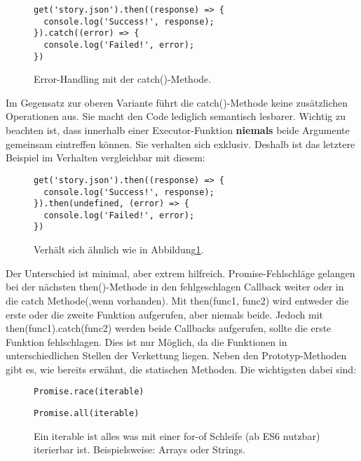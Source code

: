 \begin{figure}[H]
\begin{lstlisting}[basicstyle=\small]
get('story.json').then((response) => {
  console.log('Success!', response);
}).catch((error) => {
  console.log('Failed!', error);
})
\end{lstlisting}
\caption{Error-Handling mit der catch()-Methode\cite{callback-vs-promises}.}
\label{error-with-catch}
\end{figure}

\noindent
Im Gegensatz zur oberen Variante führt die catch()-Methode keine zusätzlichen Operationen aus. Sie macht den Code lediglich semantisch lesbarer. Wichtig zu beachten ist, dass innerhalb einer Executor-Funktion \textbf{niemals} beide Argumente gemeinsam eintreffen können. Sie verhalten sich exklusiv. Deshalb ist das letztere Beispiel im Verhalten vergleichbar mit diesem:

\begin{figure}[H]
\begin{lstlisting}[basicstyle=\small]
get('story.json').then((response) => {
  console.log('Success!', response);
}).then(undefined, (error) => {
  console.log('Failed!', error);
})
\end{lstlisting}
\caption{Verhält sich ähnlich wie in Abbildung\ref{error-with-catch}.}
\end{figure}

\noindent
Der Unterschied ist minimal, aber extrem hilfreich. Promise-Fehlschläge gelangen bei der nächsten then()-Methode in den fehlgeschlagen Callback weiter oder in die catch Methode(,wenn vorhanden). Mit then(func1, func2) wird entweder die erste oder die zweite Funktion aufgerufen, aber niemals beide. Jedoch mit then(func1).catch(func2) werden beide Callbacks aufgerufen, sollte die erste Funktion fehlschlagen. Dies ist nur Möglich, da die Funktionen in unterschiedlichen Stellen der Verkettung liegen. Neben den Prototyp-Methoden gibt es, wie bereits erwähnt, die statischen Methoden. Die wichtigsten dabei sind:


\begin{description}

\begin{figure}[H]
\item \begin{lstlisting}[basicstyle=\small]
Promise.race(iterable)
\end{lstlisting}

\item \begin{lstlisting}[basicstyle=\small]
Promise.all(iterable)
\end{lstlisting}
\caption{Ein iterable ist alles was mit einer for-of Schleife (ab ES6 nutzbar) iterierbar ist. Beispielsweise: Arrays oder Strings.}
\end{figure}
\end{description}

